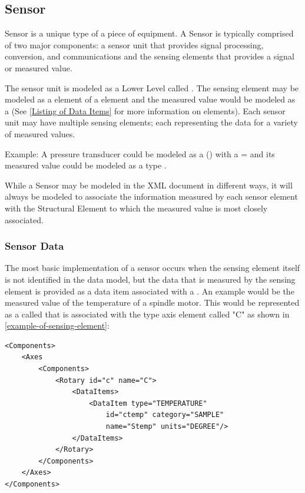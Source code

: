 \subsection{Sensor} \label{sec:Sensor}


\gls{Sensor} is a unique type of a piece of equipment.  A \gls{Sensor} is typically comprised of two major components: a \gls{sensor unit} that provides signal processing, conversion, and communications and the \glspl{sensing element} that provides a signal or measured value.

The \gls{sensor unit} is modeled as a \gls{Lower Level}  called .  The \gls{sensing element} may be modeled as a  element of a  element and the measured value would be modeled as a  (See \ref{Listing of Data Items} for more information on  elements).  Each \gls{sensor unit} may have multiple \glspl{sensing element}; each representing the data for a variety of measured values.

Example:  A pressure transducer could be modeled as a  () with a  = \cite{Pressure Transducer B} and its measured value could be modeled as a  type .

While a \gls{Sensor} may be modeled in the \gls{XML} document in different ways, it will always be modeled to associate the information measured by each \gls{sensor element} with the \gls{Structural Element} to which the measured value is most closely associated.   

\subsubsection{Sensor Data}

The most basic implementation of a sensor occurs when the \gls{sensing element} itself is not identified in the data model, but the data that is measured by the \gls{sensing element} is provided as a data item associated with a .  An example would be the measured value of the temperature of a spindle motor.  This would be represented as a  called  that is associated with the  type axis element called "C" as shown in \ref{example-of-sensing-element}:

\newpage 

\begin{lstlisting}[firstnumber=1,escapechar=|,%
    caption={Example of Sensing Element provided as data item associated with a Component}, label={lst:example-of-sensing-element}]
<Components>
    <Axes
        <Components>
            <Rotary id="c" name="C">
                <DataItems>
                    <DataItem type="TEMPERATURE" 
                        id="ctemp" category="SAMPLE" 
                        name="Stemp" units="DEGREE"/>
                </DataItems>
            </Rotary>
        </Components>
    </Axes>
</Components>
\end{lstlisting}

